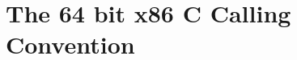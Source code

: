 \documentclass[11pt,twoside]{book}
\begin{document}
\chapter{The 64 bit x86 C Calling Convention}


%
%
\end{document}

